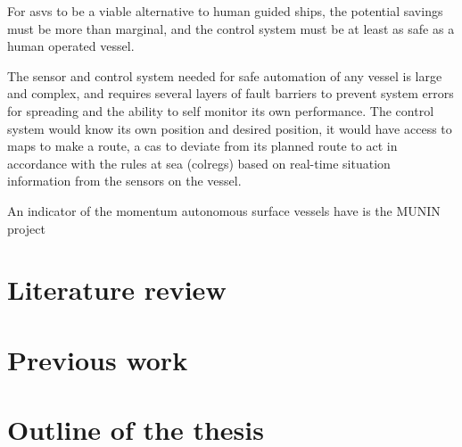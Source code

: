 For \glspl{asv} to be a viable alternative to human guided ships, the potential savings must be more than marginal, and the control system must be at least as safe as a human operated vessel. 

The sensor and control system needed for safe automation of any vessel is large and complex, and requires several layers of fault barriers to prevent system errors for spreading and the ability to self monitor its own performance. The control system would know its own position and desired position, it would have access to maps to make a route, a \gls{cas} to deviate from its planned route to act in accordance with the rules at sea (\gls{colregs}) based on real-time situation information from the sensors on the vessel.


An indicator of the momentum autonomous surface vessels have is the MUNIN project \cite{}



\section{Literature review}

\section{Previous work}

\section{Outline of the thesis}
